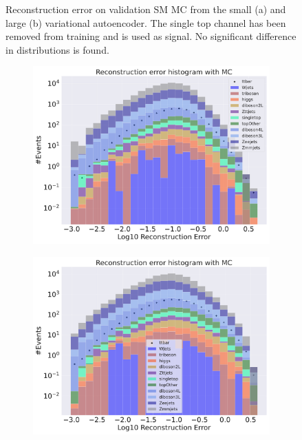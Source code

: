\begin{figure}[H]
\begin{subfigure}{.45\textwidth}
        \caption{ }
        \label{fig:vae_big_singletop}
    \end{subfigure}
    \hfill 
    \caption[VAE | Reconstruction error using Singletop channel as signal]{Reconstruction error on validation SM MC from the small (a) and large (b) variational autoencoder. The single top channel has been removed from training and 
    is used as signal. No significant difference in distributions is found. }
    \label{fig:vae_big_channel_2}
\end{figure}

\begin{figure}[H]
    \centering
    \begin{subfigure}{.45\textwidth}
        \includegraphics[width=\textwidth]{Figures/VAE_testing/small/b_data_recon_big_rm3_feats_sig_ttbar.pdf}
        \caption{}
        \label{fig:vae_small_ttbar}
    \end{subfigure}
    \hfill 
    \begin{subfigure}{.45\textwidth}
        \includegraphics[width=\textwidth]{Figures/VAE_testing/big/b_data_recon_big_rm3_feats_sig_ttbar.pdf}

\end{subfigure}
\end{figure}
